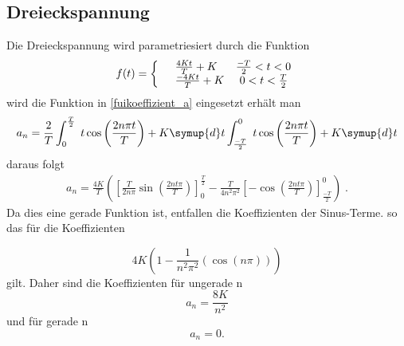\subsection{Dreieckspannung}
\label{sec:Dreieckspannung}
Die Dreieckspannung wird parametriesiert durch die Funktion
\begin{equation*}
  f(t)=\left\{
  \begin{array}{l l}
    &\frac{4Kt}{T}+K   \;\;\;\;\;\;\frac{-T}{2}<t<0 \\
    &\frac{-4Kt}{T}+K  \;\;\;\;\;0<t<\frac{T}{2}
  \end{array}
  \right.
\end{equation*}
wird die Funktion in \eqref{fuikoeffizient_a} eingesetzt erhält man
\begin{equation*}
  a_n=\frac{2}{T}\int^{\frac{T}{2}}_0 \;t \cos\left(\frac{2n \pi t}{T} \right)
  + K \symup{d}t \int^0_{\frac{-T}{2}} \; t \cos\left(\frac{2n\pi t}{T} \right) + K \symup{d}t
\end{equation*}
daraus folgt
\begin{align*}
  a_n=\frac{4K}{T}\left(\left[ \frac{T}{2n\pi}\sin(\frac{2nt\pi}{T})\right]
  ^\frac{T}{2}_0-\frac{T}{4n^2\pi^2}\left[-\cos\left(\frac{2nt\pi}{T}\right)
  \right]^0_\frac{-T}{2} \right)\;.
\end{align*}
Da dies eine gerade Funktion ist, entfallen die Koeffizienten der Sinus-Terme.
so das für die Koeffizienten

\begin{equation*}
  4K\left(1-\frac{1}{n^2\pi^2}(\cos(n\pi))\right)
\end{equation*}
gilt. Daher sind die Koeffizienten für ungerade n
\begin{equation*}
a_n=\frac{8K}{n^2}
\end{equation*}
und für gerade n
\begin{equation*}
  a_n=0.
\end{equation*}
